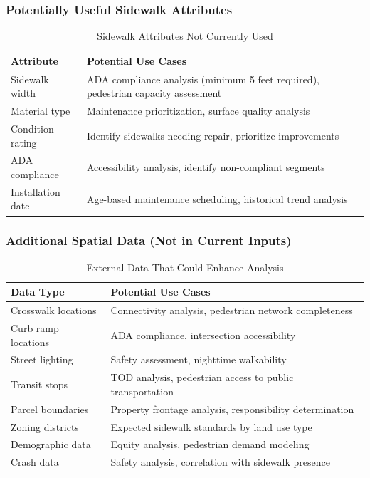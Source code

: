 \documentclass[11pt,letterpaper]{article}
\begin{document}
\subsubsection{Potentially Useful Sidewalk Attributes}

\begin{table}[H]
\centering
\begin{tabular}{p{3cm}p{9cm}}
\toprule
\textbf{Attribute} & \textbf{Potential Use Cases} \\
\midrule
Sidewalk width & ADA compliance analysis (minimum 5 feet required), pedestrian capacity assessment \\
Material type & Maintenance prioritization, surface quality analysis \\
Condition rating & Identify sidewalks needing repair, prioritize improvements \\
ADA compliance & Accessibility analysis, identify non-compliant segments \\
Installation date & Age-based maintenance scheduling, historical trend analysis \\
\bottomrule
\end{tabular}
\caption{Sidewalk Attributes Not Currently Used}
\label{tab:unused_sidewalk}
\end{table}

\subsubsection{Additional Spatial Data (Not in Current Inputs)}

\begin{table}[H]
\centering
\begin{tabular}{p{3cm}p{9cm}}
\toprule
\textbf{Data Type} & \textbf{Potential Use Cases} \\
\midrule
Crosswalk locations & Connectivity analysis, pedestrian network completeness \\
Curb ramp locations & ADA compliance, intersection accessibility \\
Street lighting & Safety assessment, nighttime walkability \\
Transit stops & TOD analysis, pedestrian access to public transportation \\
Parcel boundaries & Property frontage analysis, responsibility determination \\
Zoning districts & Expected sidewalk standards by land use type \\
Demographic data & Equity analysis, pedestrian demand modeling \\
Crash data & Safety analysis, correlation with sidewalk presence \\
\bottomrule
\end{tabular}
\caption{External Data That Could Enhance Analysis}
\label{tab:external_data}
\end{table}
\end{document}
